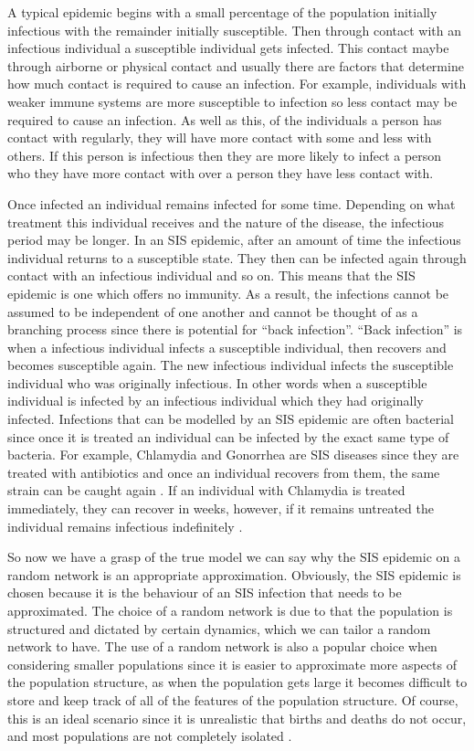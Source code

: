 \documentclass{uonmathsreport}
\begin{document}
A typical epidemic begins with a small percentage of the population initially infectious with the remainder initially susceptible. Then through contact with an infectious individual a susceptible individual gets infected. This contact maybe through airborne or physical contact and usually there are factors that determine how much contact is required to cause an infection. For example, individuals with weaker immune systems are more susceptible to infection so less contact may be required to cause an infection. As well as this, of the individuals a person has contact with regularly, they will have more contact with some and less with others. If this person is infectious then they are more likely to infect a person who they have more contact with over a person they have less contact with.

Once infected an individual remains infected for some time. Depending on what treatment this individual receives and the nature of the disease, the infectious period may be longer. In an SIS epidemic, after an amount of time the infectious individual returns to a susceptible state. They then can be infected again through contact with an infectious individual and so on. This means that the SIS epidemic is one which offers no immunity. As a result, the infections cannot be assumed to be independent of one another and cannot be thought of as a branching process since there is potential for “back infection”. “Back infection” is when a infectious individual infects a susceptible individual, then recovers and becomes susceptible again. The new infectious individual infects the susceptible individual who was originally infectious. In other words when a susceptible individual is infected by an infectious individual which they had originally infected.  Infections that can be modelled by an SIS epidemic are often bacterial since once it is treated an individual can be infected by the exact same type of bacteria. For example, Chlamydia and Gonorrhea are SIS diseases since they are treated with antibiotics and once an individual recovers from them, the same strain can be caught again \cite{bibliljeros}. If an individual with Chlamydia is treated immediately, they can recover in weeks, however, if it remains untreated the individual remains infectious indefinitely \cite{bibyorke}. 

So now we have a grasp of the true model we can say why the SIS epidemic on a random network is an appropriate approximation. Obviously, the SIS epidemic is chosen because it is the behaviour of an SIS infection that needs to be approximated. The choice of a random network is due to that the population is structured and dictated by certain dynamics, which we can tailor a random network to have. The use of a random network is also a popular choice when considering smaller populations since it is easier to approximate more aspects of the population structure, as when the population gets large it becomes difficult to store and keep track of all of the features of the population structure. Of course, this is an ideal scenario since it is unrealistic that births and deaths do not occur, and most populations are not completely isolated \cite{bibhiebeler}.
\end{document}
